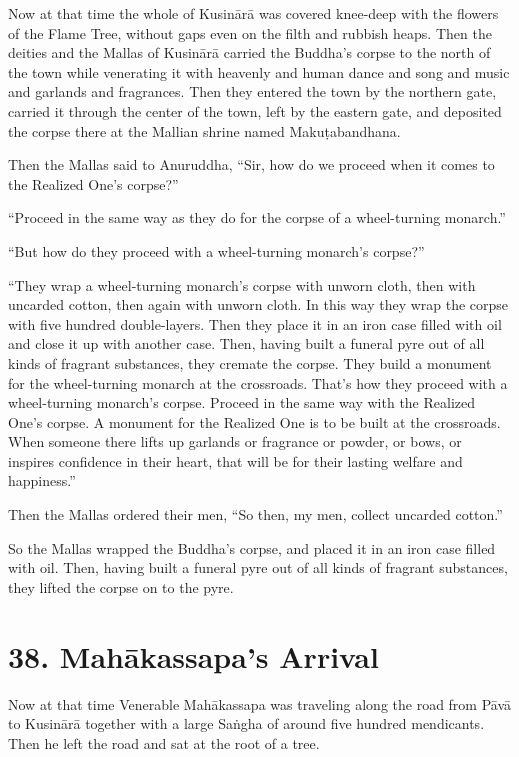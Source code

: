 \documentclass[12pt,openany]{book}%
\begin{document}
Now at that time the whole of \textsanskrit{Kusinārā} was covered knee-deep with the flowers of the Flame Tree, without gaps even on the filth and rubbish heaps. Then the deities and the Mallas of \textsanskrit{Kusinārā} carried the Buddha’s corpse to the north of the town while venerating it with heavenly and human dance and song and music and garlands and fragrances. Then they entered the town by the northern gate, carried it through the center of the town, left by the eastern gate, and deposited the corpse there at the Mallian shrine named \textsanskrit{Makuṭabandhana}. 

Then the Mallas said to Anuruddha, “Sir, how do we proceed when it comes to the Realized One’s corpse?” 

“Proceed in the same way as they do for the corpse of a wheel-turning monarch.” 

“But how do they proceed with a wheel-turning monarch’s corpse?” 

“They wrap a wheel-turning monarch’s corpse with unworn cloth, then with uncarded cotton, then again with unworn cloth. In this way they wrap the corpse with five hundred double-layers. Then they place it in an iron case filled with oil and close it up with another case. Then, having built a funeral pyre out of all kinds of fragrant substances, they cremate the corpse. They build a monument for the wheel-turning monarch at the crossroads. That’s how they proceed with a wheel-turning monarch’s corpse. Proceed in the same way with the Realized One’s corpse. A monument for the Realized One is to be built at the crossroads. When someone there lifts up garlands or fragrance or powder, or bows, or inspires confidence in their heart, that will be for their lasting welfare and happiness.” 

Then the Mallas ordered their men, “So then, my men, collect uncarded cotton.” 

So the Mallas wrapped the Buddha’s corpse, and placed it in an iron case filled with oil. Then, having built a funeral pyre out of all kinds of fragrant substances, they lifted the corpse on to the pyre. 

\section*{38. \textsanskrit{Mahākassapa}’s Arrival }

Now at that time Venerable \textsanskrit{Mahākassapa} was traveling along the road from \textsanskrit{Pāvā} to \textsanskrit{Kusinārā} together with a large \textsanskrit{Saṅgha} of around five hundred mendicants. Then he left the road and sat at the root of a tree. 
\end{document}
